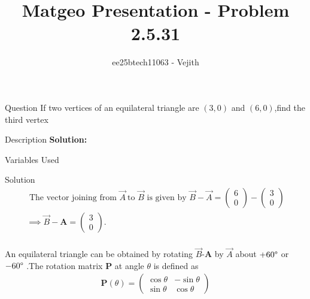 \documentclass{beamer}
\title{Matgeo Presentation - Problem 2.5.31}
\author{ee25btech11063 - Vejith}
\numberwithin{equation}{section}
\providecommand{\brak}[1]{\ensuremath{\left(#1\right)}}
\theoremstyle{remark}
\newcommand{\myvec}[1]{\ensuremath{\begin{pmatrix}#1\end{pmatrix}}}
\let\vec\mathbf
\begin{document}
\frame{\titlepage}
\begin{frame}{Question}
If two vertices of an equilateral triangle are \brak{3,0} and \brak{6,0},find the third vertex
\end{frame}

\begin{frame}{Description}
\textbf{Solution: }\\
\begin{table}[h!]    
  \centering
  
  \caption{Variables Used}
  \label{}
\end{table}
\end{frame}

\begin{frame}{Solution}
\begin{align}
   \text{ The vector joining from }\Vec{A}\ \text{to } \Vec{B} \text{ is given by } \Vec{B}-\Vec{A}=\myvec{6\\0}-\myvec{3\\0}\\
\implies \Vec{B}-\vec{A}=\myvec{3\\0}.\\
\end{align}

An equilateral triangle can be obtained by rotating $\Vec{B}$-$\vec{A}$ by $\Vec{A}$ about $+60\degree$ or $-60\degree$ .The rotation matrix $\vec{P}$ at angle $\theta$ is defined as\\
\vspace{0.5cm}
\begin{align}
    \vec{P}(\theta)=\myvec{
   \cos \theta & -\sin \theta
    \\
   \sin \theta & \cos \theta
   }\\
\end{align}
\end{frame}
\end{document}
